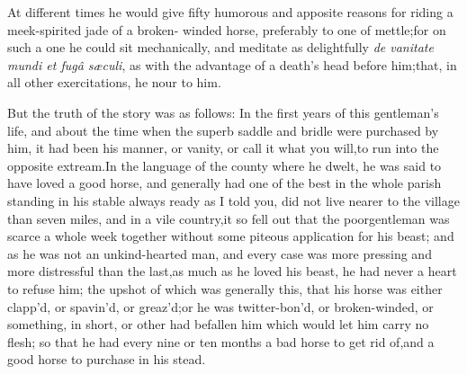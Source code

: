 \documentclass{article}
\begin{document}
At different times he would give fifty humorous and apposite
reasons for riding a meek-spirited jade of a broken-\break 
winded horse,
preferably to one of mettle;\tsk for on such a one he could sit
mechanically, and meditate as delightfully \textit{de vanitate mundi et
fugâ sæculi}, as with the advantage of a
death’s head before him;\tsk that, in all other
exercitations, he
nour to him.

But the truth of the story was as follows: In the first years of
this gentleman’s life, and about the time when the superb saddle
and bridle were purchased by him, it had been his manner, or
va\-nity, or call it what you will,\tsk to run into the opposite
extream.\tsk In the language of the county where he dwelt, he
was said to have loved a good horse, and generally had one of
the best in the whole parish standing in his stable always ready
\break
as I told you, did not
live nearer to the village than seven miles, and in a vile
country,\tsh it so fell out that the poor\break gentleman was scarce
a whole week together without some piteous application for his
beast; and as he was not an un\-kind-hearted man, and every case
was more pressing and more distressful than the last,\tsk as
much as he loved his beast, he had never a heart to refuse
him; the upshot of which was generally this, that his horse was
either clapp’d, or spavin’d, or greaz’d;\tsk or he was
twitter-bon’d, or broken-winded, or something, in short, or
other had befallen him which would let him carry no flesh;\tsk
so that he had every nine or ten months a bad horse to get rid
of,\tsk and a good horse to purchase in his stead.
\end{document}
